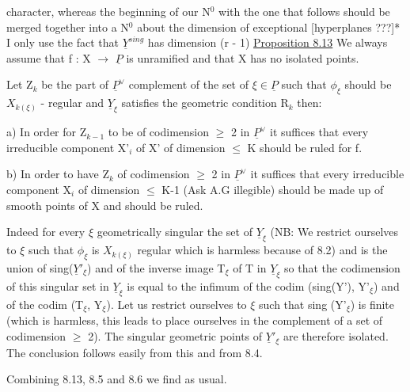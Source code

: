 
character, whereas the beginning of our N$^0$ with the one that
follows should be merged together into a N$^0$ about the dimension of
exceptional [hyperplanes ???]*  I only use the fact that $\underline{Y}^{sing}$ has
dimension (r - 1) \uline{Proposition 8.13} We always assume that 
f : X $\to$ $\underline{P}$ is unramified and that X has no isolated points.

Let Z$_k$ be the part of $\underline{P}^\vee$ complement of the set of $\xi \in \underline{P}$ such that
$\phi_\xi$ should be $X_{k(\xi)}$ - regular and $\underline{Y}_\xi$ satisfies the geometric condition
R$_k$ then:

a) In order for Z$_{k-1}$ to be of codimension $\geq$ 2 in $\underline{P}^\vee$ it
suffices that every irreducible component X'$_i$ of X' of dimension $\leq$
K should be ruled for f.

b) In order to have Z$_k$ of codimension $\geq$ 2 in $\underline{P}^\vee$ it suffices
that every irreducible component X$_i$ of dimension $\leq$ K-1 (Ask A.G
illegible) should be made up of smooth points of X and should be
ruled.

Indeed for every $\xi$ geometrically singular the set of $\underline{Y}_\xi$
(NB:  We restrict ourselves to $\xi$ such that $\phi_\xi$ is $X_{k(\xi)}$ regular which
is harmless because of 8.2) and is the union of sing($\underline{Y}'_\xi$) and of
the inverse image T$_\xi$ of T in $\underline{Y}_\xi$ so that the codimension of this
singular set in $\underline{Y}_\xi$ is equal to the infimum of the codim (sing(Y'),
Y'$_\xi$) and of the codim (T$_\xi$, Y$_\xi$).  Let us restrict ourselves to $\xi$ such
that sing (Y'$_\xi$) is finite (which is harmless, this leads to place
ourselves in the complement of a set of codimension $\geq$ 2).  The
singular geometric points of $\underline{Y}'_\xi$ are therefore isolated.  The
conclusion follows easily from this and from 8.4.

Combining 8.13, 8.5 and 8.6 we find as usual.

